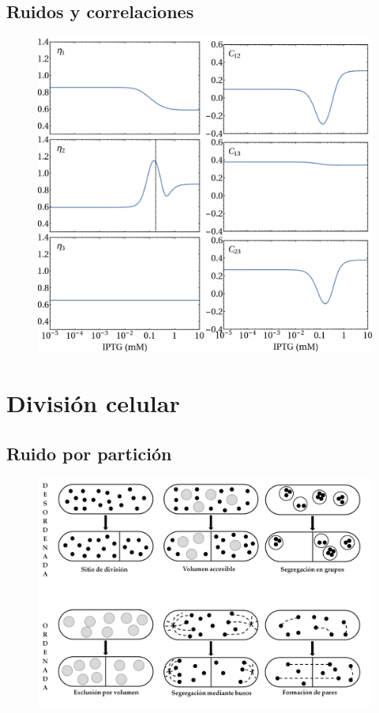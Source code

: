 \documentclass[xcolor=dvipsnames]{beamer}
\begin{document}
\subsection{Ruidos y correlaciones}
\begin{frame}
\begin{figure}[p]
    \centering
    \includegraphics[width=.7\textwidth]{lan-noise_corr_full.png}\\
\end{figure}
\end{frame}

\section{Divisi\'on celular}

\subsection{Ruido por partici\'on}
\begin{frame}
\begin{figure}[p]
    \centering
    \includegraphics[width=\textwidth]{Pdiv-draws}
\end{figure}
\end{frame}
\end{document}
